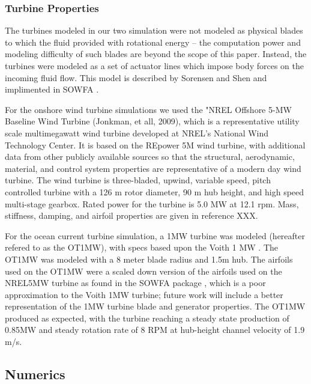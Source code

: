 


\subsubsection{Turbine Properties}

The turbines modeled in our two simulation were not modeled as physical blades to which the fluid provided with rotational energy -- the computation power and modeling difficulty of such blades are beyond the scope of this paper. Instead, the turbines were modeled as a set of actuator lines which impose body forces on the incoming fluid flow. This model is described by Sorensen and Shen \cite{sorensen:393} and implimented in SOWFA \cite{SOWFA}.

For the onshore wind turbine simulations we used the "NREL Offshore 5-MW Baseline Wind Turbine (Jonkman, et all, 2009), which is a representative utility scale multimegawatt wind turbine developed at NREL's National Wind Technology Center.  It is based on the REpower 5M wind turbine, with additional data from other publicly available sources so that the structural, aerodynamic, material, and control system properties are representative of a modern day wind turbine.  The wind turbine is three-bladed, upwind, variable speed, pitch controlled turbine with a 126 m rotor diameter, 90 m hub height, and high speed multi-stage gearbox.  Rated power for the turbine is 5.0 MW at 12.1 rpm.  Mass, stiffness, damping, and airfoil properties are given in reference XXX.

For the ocean current turbine simulation, a 1MW turbine was modeled (hereafter refered to as the OT1MW), with specs based upon the Voith 1 MW \cite{Voith}. The OT1MW was modeled with a 8 meter blade radius and 1.5m hub. The airfoils used on the OT1MW were a scaled down version of the airfoils used on the NREL5MW turbine as found in the SOWFA package \cite{SOWFA}, which is a poor approximation to the Voith 1MW turbine; future work will include a better representation of the 1MW turbine blade and generator properties. The OT1MW produced as expected, with the turbine reaching a steady state production of 0.85MW and steady rotation rate of 8 RPM at hub-height channel velocity of 1.9 m/s.



\subsection{Numerics}


